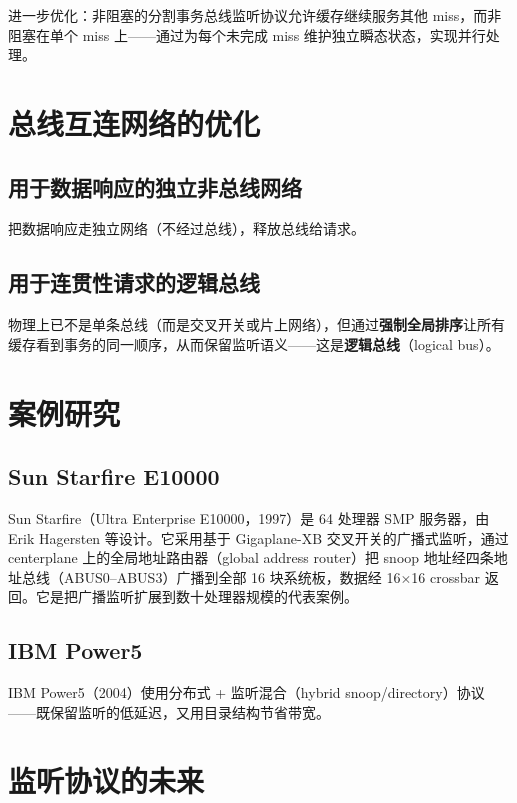 进一步优化：非阻塞的分割事务总线监听协议允许缓存继续服务其他 miss，而非阻塞在单个 miss 上——通过为每个未完成 miss 维护独立瞬态状态，实现并行处理。

\section{总线互连网络的优化}

\subsection{用于数据响应的独立非总线网络}

把数据响应走独立网络（不经过总线），释放总线给请求。

\subsection{用于连贯性请求的逻辑总线}

物理上已不是单条总线（而是交叉开关或片上网络），但通过\textbf{强制全局排序}让所有缓存看到事务的同一顺序，从而保留监听语义——这是\textbf{逻辑总线}（logical bus）。

\section{案例研究}

\subsection{Sun Starfire E10000}

Sun Starfire（Ultra Enterprise E10000，1997）是 64 处理器 SMP 服务器，由 Erik Hagersten 等设计。它采用基于 Gigaplane-XB 交叉开关的广播式监听，通过 centerplane 上的全局地址路由器（global address router）把 snoop 地址经四条地址总线（ABUS0–ABUS3）广播到全部 16 块系统板，数据经 16$\times$16 crossbar 返回。它是把广播监听扩展到数十处理器规模的代表案例。

\subsection{IBM Power5}

IBM Power5（2004）使用分布式 + 监听混合（hybrid snoop/directory）协议——既保留监听的低延迟，又用目录结构节省带宽。

\section{监听协议的未来}

